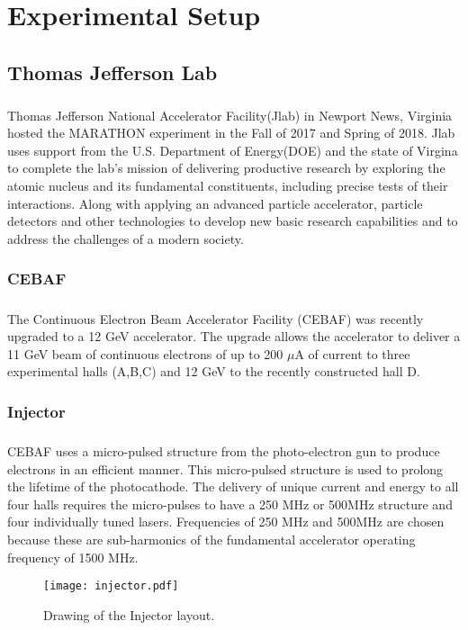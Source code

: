 


\chapter{ Experimental Setup} \label{ch:ExpUp}

\section{Thomas Jefferson Lab}
\paragraph{}Thomas Jefferson National Accelerator Facility(Jlab) in Newport News, Virginia hosted the MARATHON experiment in the Fall of 2017 and Spring of 2018. Jlab uses support from the U.S. Department of Energy(DOE) and the state of Virgina to complete the lab's mission of delivering productive research by exploring the atomic nucleus and its fundamental constituents, including precise tests of their interactions. Along with applying an advanced particle accelerator, particle detectors and other technologies to develop new basic research capabilities and to address the challenges of a modern society.
\subsection{CEBAF}\label{sec:cebaf}
	\paragraph{}The Continuous Electron Beam Accelerator Facility (CEBAF) was recently upgraded to a 12 GeV accelerator. The upgrade allows the accelerator to deliver a 11 GeV beam of continuous electrons of up to 200 $\mu$A of current to three experimental halls (A,B,C) and 12 GeV to the recently constructed hall D. 
\subsection{Injector}
	\paragraph{} CEBAF uses a micro-pulsed structure from the photo-electron gun to produce electrons in an efficient manner. This micro-pulsed structure is used to prolong the lifetime of the photocathode. The delivery of unique current and energy to all four halls requires the micro-pulses to have a 250 MHz or 500MHz structure and four individually tuned lasers. Frequencies of 250 MHz and 500MHz are chosen because these are sub-harmonics of the fundamental accelerator operating frequency of 1500 MHz. 
	\begin{figure}[t]
	\centering
	\texttt{[image: injector.pdf]} 
		\caption{Drawing of the Injector layout. }
	\label{fig:inj}
	\end{figure} 
